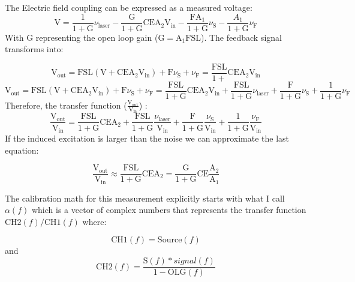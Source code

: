 The Electric field coupling can be expressed as a measured voltage:
$$\mathrm{V} = \frac{1}{1 + \mathrm{G}} \nu_\mathrm{laser} - \frac{\mathrm{G}}{1 + \mathrm{G}} \mathrm{C} \mathrm{E} \mathrm{A}_{2} \mathrm{V}_\mathrm{in} - \frac{\mathrm{F} \mathrm{A}_1}{1 + \mathrm{G}} \nu_\mathrm{S} - \frac{A_1}{1 + \mathrm{G}} \nu_\mathrm{F}$$
With G representing the open loop gain ($\mathrm{G} = \mathrm{A}_1 \mathrm{F} \mathrm{S} \mathrm{L}$). The feedback signal transforms into:

$$ \mathrm{V}_\mathrm{out} = \mathrm{F} \mathrm{S} \mathrm{L} (\mathrm{V} + \mathrm{C} \mathrm{E} \mathrm{A}_{2} \mathrm{V}_\mathrm{in}) + \mathrm{F} \nu_\mathrm{S} + \nu_\mathrm{F} = \frac{\mathrm{F} \mathrm{S} \mathrm{L}}{1 + } \mathrm{C} \mathrm{E} \mathrm{A}_{2} \mathrm{V}_\mathrm{in}
$$
$$ \mathrm{V}_\mathrm{out} = \mathrm{F} \mathrm{S} \mathrm{L} (\mathrm{V} + \mathrm{C} \mathrm{E} \mathrm{A}_{2} \mathrm{V}_\mathrm{in}) + \mathrm{F} \nu_\mathrm{S} + \nu_\mathrm{F} = \frac{\mathrm{F} \mathrm{S} \mathrm{L}}{ 1 + \mathrm{G}} \mathrm{C} \mathrm{E} \mathrm{A}_{2} \mathrm{V}_\mathrm{in} + \frac{\mathrm{F} \mathrm{S} \mathrm{L}}{ 1 + \mathrm{G}} \nu_\mathrm{laser} + \frac{\mathrm{F} }{ 1 + \mathrm{G}} \nu_\mathrm{S} +  \frac{1}{ 1 + \mathrm{G}} \nu_\mathrm{F}$$ 
Therefore, the transfer function ($\frac{\mathrm{V}_\mathrm{out}}{\mathrm{V}_\mathrm{in}}$) : 
$$ \frac{\mathrm{V}_\mathrm{out}}{\mathrm{V}_\mathrm{in}} = \frac{\mathrm{F} \mathrm{S} \mathrm{L}}{1 + \mathrm{G}}\mathrm{C} \mathrm{E} \mathrm{A}_{2}  + \frac{\mathrm{F} \mathrm{S} \mathrm{L}}{ 1 + \mathrm{G}} \frac{\nu_\mathrm{laser}}{\mathrm{V}_\mathrm{in}}+ \frac{\mathrm{F} }{ 1 + \mathrm{G}} \frac{\nu_\mathrm{S}}{\mathrm{V}_\mathrm{in}} +  \frac{1}{ 1 + \mathrm{G}} \frac{\nu_\mathrm{F}}{\mathrm{V}_\mathrm{in}}$$
If the induced excitation is larger than the noise we can approximate the last equation:

$$ \frac{\mathrm{V}_\mathrm{out}}{\mathrm{V_{in}}} \approx \frac{\mathrm{F} \mathrm{S}\mathrm{L}}{1 + \mathrm{G}} \mathrm{C} \mathrm{E} \mathrm{A}_{2} = \frac{\mathrm{G}}{1 + \mathrm{G}} \mathrm{C} \mathrm{E} \frac{\mathrm{A}_{2}}{\mathrm{A}_{1}} $$
 

\iffalse
The calibration math for this measurement explicitly starts with what I
call \(\alpha(f)\) which is a vector of complex numbers that represents
the transfer function \(\mathrm{CH2}(f)/\mathrm{CH1}(f)\) where:

\[\mathrm{CH1}(f) = \mathrm{Source}(f)\] and
\[\mathrm{CH2}(f) = \frac{\mathrm{S}(f)* signal(f)}{1-\mathrm{OLG}(f)}\]

